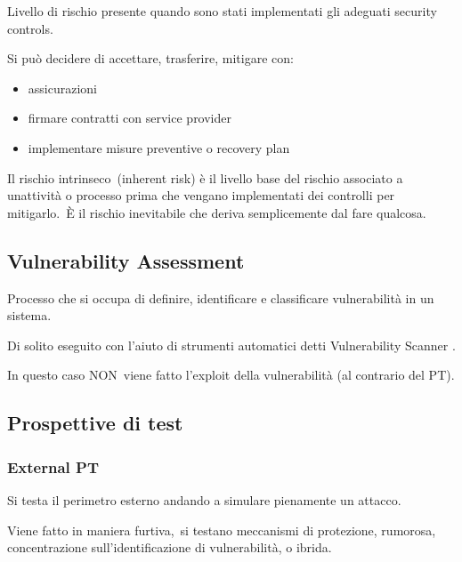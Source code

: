 \documentclass[
]{article}
\providecommand{\tightlist}{%
  \setlength{\itemsep}{0pt}\setlength{\parskip}{0pt}}
\begin{document}
{Livello di rischio presente quando sono stati implementati gli adeguati
security controls.}

{}

{Si può decidere di accettare, trasferire, mitigare con:}

\begin{itemize}
\tightlist
\item
  {assicurazioni}
\item
  {firmare contratti con service provider}
\item
  {implementare misure preventive o recovery plan}
\end{itemize}

{}

{Il }{rischio intrinseco}{~(inherent risk) è il livello base del rischio
associato a un\textquotesingle attività o processo prima che vengano
implementati dei controlli per }{mitigarlo.}{~È il rischio inevitabile
che deriva semplicemente dal fare qualcosa.}

\subsection{\texorpdfstring{{Vulnerability
Assessment}}{Vulnerability Assessment}}\label{h.fjkal9dgviq9}

{Processo che si occupa di definire, identificare e classificare
vulnerabilità in un sistema.}

{Di solito eseguito con l'aiuto di strumenti automatici detti
Vulnerability Scanner .}

{}

{In questo caso }{NON}{~viene fatto l'exploit della vulnerabilità (al
contrario del PT).}

\subsection{\texorpdfstring{{Prospettive di
test}}{Prospettive di test}}\label{h.mwys6d7ttdnx}

\subsubsection{\texorpdfstring{{External
PT}}{External PT}}\label{h.rzpqn7rmn3x4}

{Si testa il perimetro esterno andando a simulare pienamente un attacco.
}

{}

{Viene fatto in maniera }{furtiva,}{~si testano meccanismi di
protezione, }{rumorosa}{, concentrazione sull'identificazione di
vulnerabilità, o }{ibrida}{.}
\end{document}

